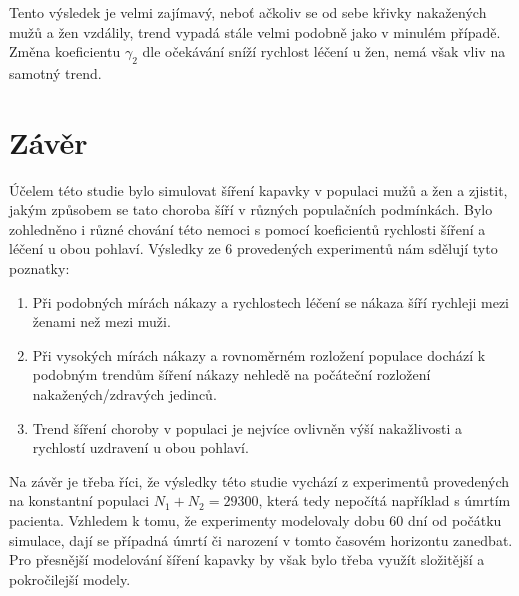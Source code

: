 \documentclass{article}
\begin{document}
Tento výsledek je velmi zajímavý, neboť ačkoliv se od sebe křivky nakažených mužů a žen vzdálily, trend vypadá stále velmi podobně jako v minulém případě. Změna koeficientu $\gamma_2$ dle očekávání sníží rychlost léčení u žen, nemá však vliv na samotný trend.
\newpage

\section{Závěr}
Účelem této studie bylo simulovat šíření kapavky v populaci mužů a žen a zjistit, jakým způsobem se tato choroba šíří v různých populačních podmínkách. Bylo zohledněno i různé chování této nemoci s pomocí koeficientů rychlosti šíření a léčení u obou pohlaví. Výsledky ze 6 provedených experimentů nám sdělují tyto poznatky:
\begin{enumerate}
    \item Při podobných mírách nákazy a rychlostech léčení se nákaza šíří rychleji mezi ženami než mezi muži.
    \item Při vysokých mírách nákazy a rovnoměrném rozložení populace dochází k podobným trendům šíření nákazy nehledě na počáteční rozložení nakažených/zdravých jedinců.
    \item Trend šíření choroby v populaci je nejvíce ovlivněn výší nakažlivosti a rychlostí uzdravení u obou pohlaví.
\end{enumerate}
Na závěr je třeba říci, že výsledky této studie vychází z experimentů provedených na konstantní populaci $N_1+N_2=29300$, která tedy nepočítá například s úmrtím pacienta. Vzhledem k tomu, že experimenty modelovaly dobu 60 dní od počátku simulace, dají se případná úmrtí či narození v tomto časovém horizontu zanedbat. Pro přesnější modelování šíření kapavky by však bylo třeba využít složitější a pokročilejší modely.
\newpage



\end{document}
